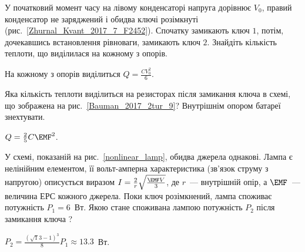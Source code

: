 \begin{problem}\label{prb:Zhurnal_Kvant_2017_7_F2452}%
    У початковий момент часу на лівому конденсаторі напруга дорівнює $V_0$, правий конденсатор не заряджений і обидва ключі розімкнуті (рис.~\ref{Zhurnal_Kvant_2017_7_F2452}). Спочатку замикають ключ $1$, потім, дочекавшись встановлення рівноваги, замикають ключ $2$. Знайдіть кількість теплоти, що виділилася на кожному з опорів.
\begin{solution}
	На кожному з опорів виділиться $Q = \frac{CV_0^2}{6}$.
\end{solution}
\end{problem}

\begin{problem}\label{prb:Bauman_2017_2tur_9}%
    Яка кількість теплоти виділиться на резисторах після замикання ключа в схемі, що зображена на рис.~\ref{Bauman_2017_2tur_9}? Внутрішнім опором батареї знехтувати.
\begin{solution}
	$Q = \frac25 C\EMF^2$.
\end{solution}
\end{problem}

\begin{problem}\label{prb:nonlinear_lamp}%
    У схемі, показаній на рис.~\ref{nonlinear_lamp}, обидва джерела однакові. Лампа є нелінійним елементом, її вольт-амперна характеристика (зв'язок струму з напругою) описується виразом $I = \frac2r\sqrt{\frac{\EMF V}{3}}$, де $r$~--- внутрішній опір, а $\EMF$~--- величина ЕРС кожного джерела. Поки ключ розімкнений, лампа споживає потужність $P_1 = 6$~Вт. Якою стане споживана лампою потужність $P_2$ після замикання ключа ?
\begin{solution}
	$P_2 = \frac{(\sqrt13 - 1)^3}{8}P_1 \approx 13.3$~Вт.
\end{solution}
\end{problem}

